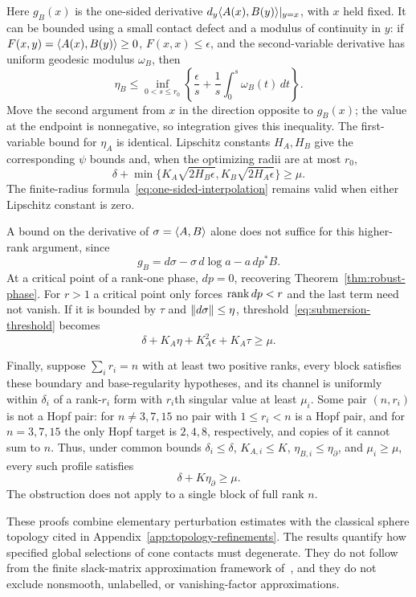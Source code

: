 Here $g_B(x)$ is the one-sided derivative
$d_y\langle A(x),B(y)\rangle|_{y=x}$, with $x$ held fixed. It can be bounded
using a small contact defect and a modulus of continuity in $y$:
if $F(x,y)=\langle A(x),B(y)\rangle\geq0$, $F(x,x)\leq\epsilon$, and the
second-variable derivative has uniform geodesic modulus $\omega_B$,
then
\begin{equation}\label{eq:one-sided-interpolation}
 \eta_B\leq\inf_{0<s\leq r_0}
 \left\{\frac{\epsilon}{s}+
              \frac1s\int_0^s\omega_B(t)\,dt\right\}.
\end{equation}
Move the second argument from $x$ in the direction opposite to
$g_B(x)$; the value at the endpoint is nonnegative, so integration
gives this inequality. The first-variable bound for $\eta_A$ is
identical. Lipschitz constants $H_A,H_B$ give the corresponding $\psi$
bounds and, when the optimizing radii are at most $r_0$,
\[
 \delta+\min\{K_A\sqrt{2H_B\epsilon},
                    K_B\sqrt{2H_A\epsilon}\}\geq\mu.
\]
The finite-radius formula~\eqref{eq:one-sided-interpolation} remains
valid when either Lipschitz constant is zero.

A bound on the derivative of $\sigma=\langle A,B\rangle$ alone does not suffice for
this higher-rank argument, since
\[
 g_B=d\sigma-\sigma\,d\log a-a\,dp^*B.
\]
At a critical point of a rank-one phase, $dp=0$, recovering
Theorem~\ref{thm:robust-phase}. For $r>1$ a critical point only forces
$\operatorname{rank} dp<r$ and the last term need not vanish. If it is bounded by
$\tau$ and $\lVert d\sigma\rVert\leq\eta$,
threshold~\eqref{eq:submersion-threshold} becomes
\[
 \delta+K_A\eta+K_A^2\epsilon+K_A\tau\geq\mu.
\]

Finally, suppose $\sum_i r_i=n$ with at least two positive ranks, every
block satisfies these boundary and base-regularity hypotheses, and its
channel is uniformly within $\delta_i$ of a rank-$r_i$ form with $r_i$th
singular value at least $\mu_i$. Some pair $(n,r_i)$ is not a Hopf
pair: for $n\ne3,7,15$ no pair with
$1\leq r_i<n$ is a Hopf pair, and for $n=3,7,15$ the only Hopf target
is $2,4,8$, respectively, and copies of it cannot sum to $n$. Thus, under common bounds
$\delta_i\leq\delta$, $K_{A,i}\leq K$, $\eta_{B,i}\leq\eta_\partial$,
and $\mu_i\geq\mu$, every such profile satisfies
\[
 \delta+K\eta_\partial\geq\mu.
\]
The obstruction does not apply to a single block of full rank $n$.

These proofs combine elementary perturbation estimates with the
classical sphere topology cited in
Appendix~\ref{app:topology-refinements}. The results quantify how
specified global selections of cone contacts must degenerate. They do
not follow from the finite slack-matrix approximation framework
of~\cite{GPTApprox2015}, and they do not exclude nonsmooth, unlabelled,
or vanishing-factor approximations.
